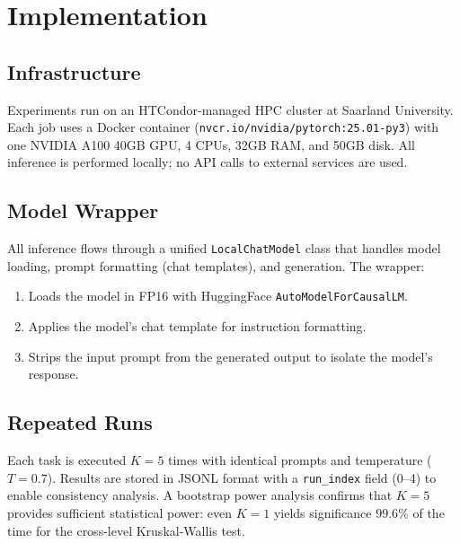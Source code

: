 \documentclass[runningheads]{llncs}
\begin{document}
\section{Implementation}
\label{sec:implementation}

\subsection{Infrastructure}
\label{sec:infrastructure}

Experiments run on an HTCondor-managed HPC cluster at Saarland University. Each job uses a Docker container (\texttt{nvcr.io/nvidia/pytorch:25.01-py3}) with one NVIDIA A100 40GB GPU, 4 CPUs, 32GB RAM, and 50GB disk. All inference is performed locally; no API calls to external services are used.

\subsection{Model Wrapper}
\label{sec:model-wrapper}

All inference flows through a unified \texttt{LocalChatModel} class that handles model loading, prompt formatting (chat templates), and generation. The wrapper:

\begin{enumerate}[noitemsep]
  \item Loads the model in FP16 with HuggingFace \texttt{AutoModelForCausalLM}.
  \item Applies the model's chat template for instruction formatting.
  \item Strips the input prompt from the generated output to isolate the model's response.
\end{enumerate}

\subsection{Repeated Runs}
\label{sec:repeated-runs}

Each task is executed $K\!=\!5$ times with identical prompts and temperature ($T\!=\!0.7$). Results are stored in JSONL format with a \texttt{run\_index} field (0--4) to enable consistency analysis. A bootstrap power analysis confirms that $K\!=\!5$ provides sufficient statistical power: even $K\!=\!1$ yields significance $99.6\%$ of the time for the cross-level Kruskal-Wallis test.

\end{document}
